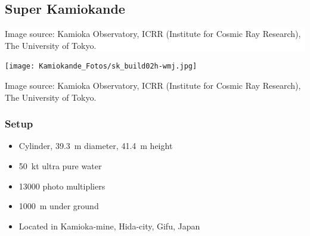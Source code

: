 \documentclass[english, fleqn]{beamer}
\begin{document}
\subsection{Super Kamiokande}

{
    \begin{frame}

        \vspace{35ex}

        \colorbox{white}{%
            \begin{minipage}{.6\linewidth}
                \footnotesize
                Image source:
                Kamioka Observatory, ICRR (Institute for Cosmic Ray Research),
                The University of Tokyo.
                \parencite{super-k/images}
            \end{minipage}
        }
    \end{frame}
}

\begin{frame}
    {
        \centering
        \texttt{[image: Kamiokande\_Fotos/sk\_build02h-wmj.jpg]}
    }

    {
        \footnotesize
        Image source:
        Kamioka Observatory, ICRR (Institute for Cosmic Ray Research),
        The University of Tokyo.
        \parencite{super-k/images}
    }
\end{frame}

\begin{frame}
    \frametitle{Setup}

    \begin{itemize}
        \item Cylinder, \SI{39.3}{\meter} diameter, \SI{41.4}{\meter} height
        \item \SI{50}{\kilo\tonne} ultra pure water
        \item \num{13000} photo multipliers
        \item \SI{1000}{\meter} under ground
        \item Located in Kamioka-mine, Hida-city, Gifu, Japan
    \end{itemize}

    \parencite{super-k/overview}
\end{frame}
\end{document}
